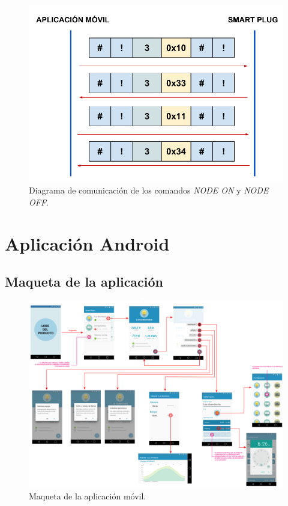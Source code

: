 \begin{figure}[h]
	\centering
	\includegraphics[width=12cm]{./Figures/3_2_5_comunicacion_NODE.pdf}
	\caption{Diagrama de comunicación de los comandos \textit{NODE ON} y \textit{NODE OFF}.}
	\label{fig:comunicacion_node}
\end{figure}


\section{Aplicación Android}
\label{section:app}

\subsection{Maqueta de la aplicación}

\begin{figure}[h]
	\centering
	\includegraphics[width=18cm, angle=90]{./Figures/3_3_1_app_wireframe.png}
	\caption{Maqueta de la aplicación móvil.}
	\label{fig:comunicacion_app_wireframe}
\end{figure}


